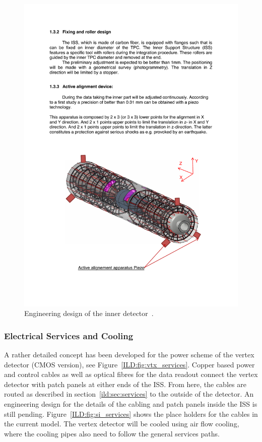 \begin{figure}[h!]
    \centering
        \includegraphics[width=0.8\hsize]{Integration/fig/Inner_Detector_Integration.pdf}
    \caption{Engineering design of the inner detector~\cite{ild:bib:inner_detector_integration}.}
    \label{ILD:fig:inner_detector_integration}
\end{figure}

\subsubsection{Electrical Services and Cooling}
A rather detailed concept has been developed for the power scheme of the vertex detector (CMOS version), see Figure~\ref{ILD:fig:vtx_services}. Copper based power and control cables as well as optical fibres for the data readout connect the vertex detector with patch panels at either ends of the ISS. From here, the cables are routed as described in section~\ref{ild:sec:services} to the outside of the detector. An engineering design for the details of the cabling and patch panels inside the ISS is still pending. Figure~\ref{ILD:fig:si_services} shows the place holders for the cables in the current model. The vertex detector will be cooled using air flow cooling, where the cooling pipes also need to follow the general services paths.

